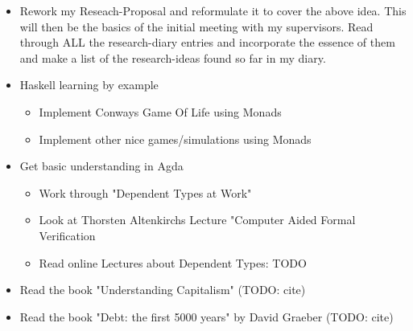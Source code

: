 \begin{itemize}
\item Rework my Reseach-Proposal and reformulate it to cover the above idea. 
This will then be the basics of the initial meeting with my supervisors. Read through ALL the research-diary entries and incorporate the essence of them and make a list of the research-ideas found so far in my diary.

\item Haskell learning by example
	\begin{itemize}
	\item Implement Conways Game Of Life using Monads
	\item Implement other nice games/simulations using Monads
	\end{itemize}
	
\item Get basic understanding in Agda 
	\begin{itemize}
	\item Work through "Dependent Types at Work"
	\item Look at Thorsten Altenkirchs Lecture "Computer Aided Formal Verification
	\item Read online Lectures about Dependent Types: TODO
	\end{itemize}

\item Read the book "Understanding Capitalism" (TODO: cite)
\item Read the book "Debt: the first 5000 years" by David Graeber (TODO: cite)

\end{itemize}